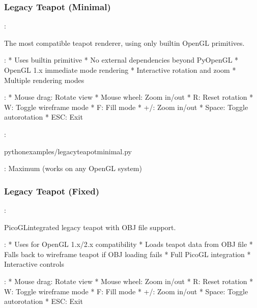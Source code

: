 \documentclass[a4paper,10pt,english,openany,oneside]{sphinxmanual}
\begin{document}
\subsubsection{Legacy Teapot (Minimal)}
\label{\detokenize{legacy_examples:legacy-teapot-minimal}}
\sphinxAtStartPar
{}: 

\sphinxAtStartPar
The most compatible teapot renderer, using only built\sphinxhyphen{}in OpenGL primitives.

\sphinxAtStartPar
{}:
* Uses  built\sphinxhyphen{}in primitive
* No external dependencies beyond PyOpenGL
* OpenGL 1.x immediate mode rendering
* Interactive rotation and zoom
* Multiple rendering modes

\sphinxAtStartPar
{}:
* Mouse drag: Rotate view
* Mouse wheel: Zoom in/out
* R: Reset rotation
* W: Toggle wireframe mode
* F: Fill mode
* +/\sphinxhyphen{}: Zoom in/out
* Space: Toggle auto\sphinxhyphen{}rotation
* ESC: Exit

\sphinxAtStartPar
{}:

\begin{sphinxVerbatim}[commandchars=\\\{\}]
pythonexamples/legacy\PYGZus{}teapot\PYGZus{}minimal.py
\end{sphinxVerbatim}

\sphinxAtStartPar
{}: Maximum (works on any OpenGL system)


\subsubsection{Legacy Teapot (Fixed)}
\label{\detokenize{legacy_examples:legacy-teapot-fixed}}
\sphinxAtStartPar
{}: 

\sphinxAtStartPar
PicoGL\sphinxhyphen{}integrated legacy teapot with OBJ file support.

\sphinxAtStartPar
{}:
* Uses  for OpenGL 1.x/2.x compatibility
* Loads teapot data from OBJ file
* Falls back to wireframe teapot if OBJ loading fails
* Full PicoGL integration
* Interactive controls

\sphinxAtStartPar
{}:
* Mouse drag: Rotate view
* Mouse wheel: Zoom in/out
* R: Reset rotation
* W: Toggle wireframe mode
* F: Fill mode
* +/\sphinxhyphen{}: Zoom in/out
* Space: Toggle auto\sphinxhyphen{}rotation
* ESC: Exit
\end{document}
